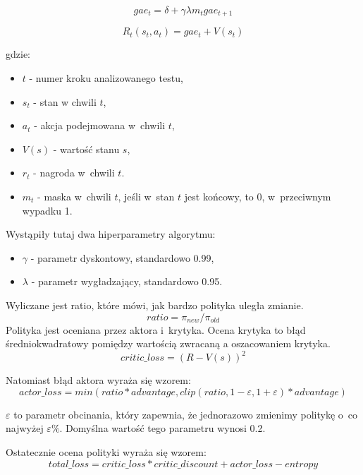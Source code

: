 \documentclass[a4paper,12pt]{article}
\begin{document}
\begin{equation}
	gae_t = \delta + \gamma \lambda m_t gae_{t+1}
\end{equation}

\begin{equation}
	R_t(s_t,a_t) = gae_t + V(s_t)
\end{equation}

gdzie:
\begin{itemize}
	\item $t$ - numer kroku analizowanego testu,
	\item $s_t$ - stan w chwili $t$,
	\item $a_t$ - akcja podejmowana w~chwili $t$,
	\item $V(s)$ - wartość stanu $s$,
	\item $r_t$ - nagroda w~chwili $t$.
	\item $m_t$ - maska w~chwili $t$, jeśli w~stan $t$ jest końcowy, to 0, w~przeciwnym wypadku 1.
\end{itemize}

Wystąpiły tutaj dwa hiperparametry algorytmu:
\begin{itemize}
	\item $\gamma$ - parametr dyskontowy, standardowo 0.99,
	\item $\lambda$ - parametr wygładzający, standardowo 0.95.
\end{itemize}

Wyliczane jest ratio, które mówi, jak bardzo polityka uległa zmianie.
\begin{equation}
	ratio = \pi_{new} / \pi_{old}
\end{equation}
Polityka jest oceniana przez aktora i~krytyka. Ocena krytyka to błąd średniokwadratowy pomiędzy wartością zwracaną a oszacowaniem krytyka.
\begin{equation}
	critic\_loss = (R - V(s))^2
\end{equation}

Natomiast błąd aktora wyraża się wzorem:
\begin{equation}
	actor\_loss = min(ratio * advantage, clip(ratio, 1-\varepsilon,1+\varepsilon)* advantage)
\end{equation}

$\varepsilon$ to parametr obcinania, który zapewnia, że jednorazowo zmienimy politykę o~co najwyżej $\varepsilon\%$. Domyślna wartość tego parametru wynosi 0.2.

Ostatecznie ocena polityki wyraża się wzorem:
\begin{equation}
	total\_loss = critic\_loss * critic\_discount + actor\_loss - entropy
\end{equation}
\end{document}
